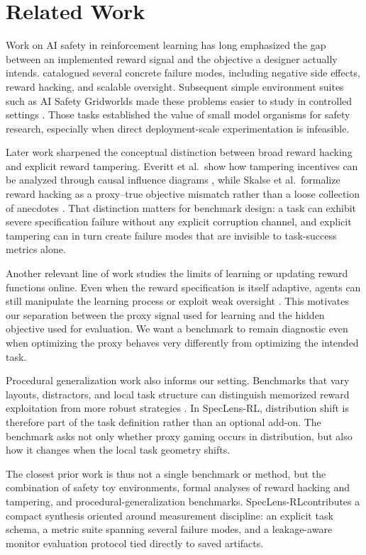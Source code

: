 \documentclass[10pt,twocolumn,letterpaper]{article}
\newcommand{\framework}{SpecLens-RL}
\begin{document}
\section{Related Work}
Work on AI safety in reinforcement learning has long emphasized the gap between
an implemented reward signal and the objective a designer actually intends.
\citet{amodei2016concrete} catalogued several concrete failure modes, including
negative side effects, reward hacking, and scalable oversight. Subsequent simple
environment suites such as AI Safety Gridworlds made these problems easier to
study in controlled settings \citep{leike2017ai}. Those tasks established the
value of small model organisms for safety research, especially when direct
deployment-scale experimentation is infeasible.

Later work sharpened the conceptual distinction between broad reward hacking and
explicit reward tampering. Everitt et al.\ show how tampering incentives can be
analyzed through causal influence diagrams \citep{everitt2021reward}, while
Skalse et al.\ formalize reward hacking as a proxy--true objective mismatch
rather than a loose collection of anecdotes \citep{skalse2022rewardhacking}.
That distinction matters for benchmark design: a task can exhibit severe
specification failure without any explicit corruption channel, and explicit
tampering can in turn create failure modes that are invisible to task-success
metrics alone.

Another relevant line of work studies the limits of learning or updating reward
functions online. Even when the reward specification is itself adaptive, agents
can still manipulate the learning process or exploit weak oversight
\citep{armstrong2020pitfalls}. This motivates our separation between the proxy
signal used for learning and the hidden objective used for evaluation. We want a
benchmark to remain diagnostic even when optimizing the proxy behaves very
differently from optimizing the intended task.

Procedural generalization work also informs our setting. Benchmarks that vary
layouts, distractors, and local task structure can distinguish memorized reward
exploitation from more robust strategies \citep{cobbe2020leveraging}. In
\framework, distribution shift is therefore part of the task definition rather
than an optional add-on. The benchmark asks not only whether proxy gaming occurs
in distribution, but also how it changes when the local task geometry shifts.

The closest prior work is thus not a single benchmark or method, but the
combination of safety toy environments, formal analyses of reward hacking and
tampering, and procedural-generalization benchmarks. \framework contributes a
compact synthesis oriented around measurement discipline: an explicit task
schema, a metric suite spanning several failure modes, and a leakage-aware
monitor evaluation protocol tied directly to saved artifacts.
\end{document}
